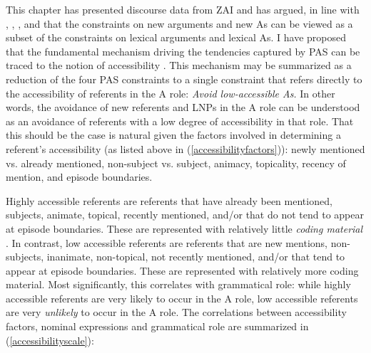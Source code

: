 This chapter has presented discourse data from ZAI and has argued, in line with \citet{haspelmath2006}, \citet{everett2009}, \citet{haig2016}, and \citet{schnell2017} that the constraints on new arguments and new As can be viewed as a subset of the constraints on lexical arguments and lexical As. I have proposed that the fundamental mechanism driving the tendencies captured by PAS can be traced to the notion of accessibility \citep{ariel1990,ariel2001}. This mechanism may be summarized as a reduction of the four PAS constraints to a single constraint that refers directly to the accessibility of referents in the A role: \textit{Avoid low-accessible As.} In other words, the avoidance of new referents and LNPs in the A role can be understood as an avoidance of referents with a low degree of accessibility in that role. That this should be the case is natural given the factors involved in determining a referent's accessibility (as listed above in (\ref{accessibilityfactors})): newly mentioned vs. already mentioned, non-subject vs. subject, animacy, topicality, recency of mention, and episode boundaries. 

Highly accessible referents are referents that have already been mentioned, subjects, animate, topical, recently mentioned, and/or that do not tend to appear at episode boundaries. These are represented with relatively little \textit{coding material} \citep{givon1983}. In contrast, low accessible referents are referents that are new mentions, non-subjects, inanimate, non-topical, not recently mentioned, and/or that tend to appear at episode boundaries. These are represented with relatively more coding material. Most significantly, this correlates with grammatical role: while highly accessible referents are very likely to occur in the A role, low accessible referents are very \textit{unlikely} to occur in the A role. The correlations between accessibility factors, nominal expressions and grammatical role are summarized in (\ref{accessibilityscale}):


